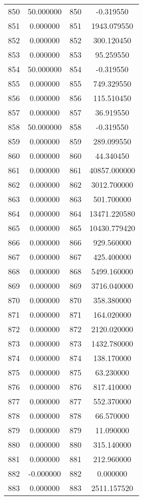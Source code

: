\documentclass[12pt]{article}
\begin{document}
\begin{longtable}{@{}cccc@{}}
850 & 50.000000 & 850 & -0.319550 \\
851 & 0.000000 & 851 & 1943.079550 \\
852 & 0.000000 & 852 & 300.120450 \\
853 & 0.000000 & 853 & 95.259550 \\
854 & 50.000000 & 854 & -0.319550 \\
855 & 0.000000 & 855 & 749.329550 \\
856 & 0.000000 & 856 & 115.510450 \\
857 & 0.000000 & 857 & 36.919550 \\
858 & 50.000000 & 858 & -0.319550 \\
859 & 0.000000 & 859 & 289.099550 \\
860 & 0.000000 & 860 & 44.340450 \\
861 & 0.000000 & 861 & 40857.000000 \\
862 & 0.000000 & 862 & 3012.700000 \\
863 & 0.000000 & 863 & 501.700000 \\
864 & 0.000000 & 864 & 13471.220580 \\
865 & 0.000000 & 865 & 10430.779420 \\
866 & 0.000000 & 866 & 929.560000 \\
867 & 0.000000 & 867 & 425.400000 \\
868 & 0.000000 & 868 & 5499.160000 \\
869 & 0.000000 & 869 & 3716.040000 \\
870 & 0.000000 & 870 & 358.380000 \\
871 & 0.000000 & 871 & 164.020000 \\
872 & 0.000000 & 872 & 2120.020000 \\
873 & 0.000000 & 873 & 1432.780000 \\
874 & 0.000000 & 874 & 138.170000 \\
875 & 0.000000 & 875 & 63.230000 \\
876 & 0.000000 & 876 & 817.410000 \\
877 & 0.000000 & 877 & 552.370000 \\
878 & 0.000000 & 878 & 66.570000 \\
879 & 0.000000 & 879 & 11.090000 \\
880 & 0.000000 & 880 & 315.140000 \\
881 & 0.000000 & 881 & 212.960000 \\
882 & -0.000000 & 882 & 0.000000 \\
883 & 0.000000 & 883 & 2511.157520 \\

\end{longtable}
\end{document}
